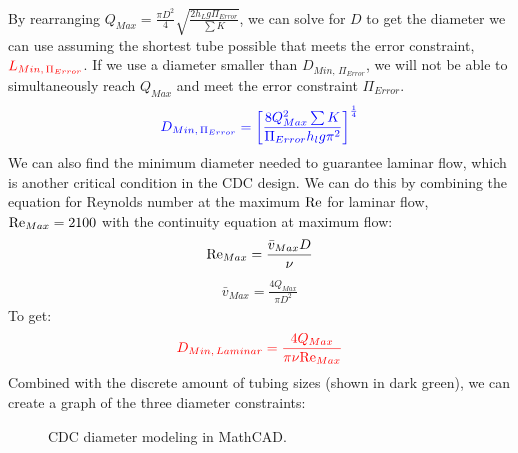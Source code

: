 \documentclass[letterpaper,10pt,english]{sphinxmanual}
\let\sphinxpxdimen\pdfpxdimen\else\newdimen\sphinxpxdimen
\begin{document}
By rearranging \(Q_{Max} = \frac{\pi D^2}{4} \sqrt{\frac{2 h_L g \Pi_{Error}}{\sum K }}\), we can solve for \(D\) to get the  diameter we can use assuming the shortest tube possible that meets the error constraint, \(\color{red}{L_{Min, \, \Pi_{Error}}}\). If we use a diameter smaller than \(D_{Min, \, \Pi_{Error}}\), we will not be able to simultaneously reach \(Q_{Max}\) and meet the error constraint \(\Pi_{Error}\).
\begin{equation}\label{equation:Flow_Control_and_Measurement/FCM_Derivations:Flow_Control_and_Measurement/FCM_Derivations:38}
\begin{split}\color{blue}{
D_{Min, \, \Pi_{Error}} = \left[ \frac{8 Q_{Max}^2 \sum K}{\Pi_{Error} h_l g \pi^2} \right]^{\frac{1}{4}}
}\end{split}
\end{equation}
We can also find the minimum diameter needed to guarantee laminar flow, which is another critical condition in the CDC design. We can do this by combining the equation for Reynolds number at the maximum \(\rm{Re}\) for laminar flow, \({\rm{Re}}_{Max} = 2100\) with the continuity equation at maximum flow:
\begin{equation}\label{equation:Flow_Control_and_Measurement/FCM_Derivations:Flow_Control_and_Measurement/FCM_Derivations:39}
\begin{split}{\rm Re}_{Max}  = \frac{\bar v_{Max} D}{\nu}\end{split}
\end{equation}\begin{equation}\label{equation:Flow_Control_and_Measurement/FCM_Derivations:Flow_Control_and_Measurement/FCM_Derivations:40}
\begin{split}\bar v_{Max} = \frac{4 Q_{Max}}{\pi D^2}\end{split}
\end{equation}
To get:
\begin{equation}\label{equation:Flow_Control_and_Measurement/FCM_Derivations:Flow_Control_and_Measurement/FCM_Derivations:41}
\begin{split}\color{red}{
D_{Min, \, Laminar} = \frac{4 Q_{Max}}{\pi \nu {\rm{Re}}_{Max}}
}\end{split}
\end{equation}
Combined with the discrete amount of tubing sizes (shown in dark green), we can create a graph of the three diameter constraints:

\begin{figure}[htbp]
\centering
\capstart

\noindent\sphinxincludegraphics[width=600\sphinxpxdimen]{{CDC_diameter_model}.png}
\caption{CDC diameter modeling in MathCAD.}\label{\detokenize{Flow_Control_and_Measurement/FCM_Derivations:id8}}\label{\detokenize{Flow_Control_and_Measurement/FCM_Derivations:cdc-diameter-model}}\end{figure}
\end{document}
